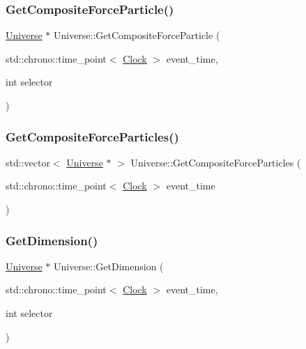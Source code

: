 \mbox{\label{classUniverse_a3e2acc1d75765a6e8e852fca919c5b96}} 
\subsubsection{\texorpdfstring{Get\+Composite\+Force\+Particle()}{GetCompositeForceParticle()}}
{\footnotesize\ttfamily \mbox{\hyperlink{classUniverse}{Universe}} $\ast$ Universe\+::\+Get\+Composite\+Force\+Particle (\begin{DoxyParamCaption}\item[{std\+::chrono\+::time\+\_\+point$<$ \mbox{\hyperlink{universe_8h_a0ef8d951d1ca5ab3cfaf7ab4c7a6fd80}{Clock}} $>$}]{event\+\_\+time,  }\item[{int}]{selector }\end{DoxyParamCaption})}

\mbox{\label{classUniverse_aed37d7224b4e31bdfb0632e39bf19694}} 
\subsubsection{\texorpdfstring{Get\+Composite\+Force\+Particles()}{GetCompositeForceParticles()}}
{\footnotesize\ttfamily std\+::vector$<$ \mbox{\hyperlink{classUniverse}{Universe}} $\ast$ $>$ Universe\+::\+Get\+Composite\+Force\+Particles (\begin{DoxyParamCaption}\item[{std\+::chrono\+::time\+\_\+point$<$ \mbox{\hyperlink{universe_8h_a0ef8d951d1ca5ab3cfaf7ab4c7a6fd80}{Clock}} $>$}]{event\+\_\+time }\end{DoxyParamCaption})}

\mbox{\label{classUniverse_ab79a380dee684c6dc304b571f4d28645}} 
\subsubsection{\texorpdfstring{Get\+Dimension()}{GetDimension()}}
{\footnotesize\ttfamily \mbox{\hyperlink{classUniverse}{Universe}} $\ast$ Universe\+::\+Get\+Dimension (\begin{DoxyParamCaption}\item[{std\+::chrono\+::time\+\_\+point$<$ \mbox{\hyperlink{universe_8h_a0ef8d951d1ca5ab3cfaf7ab4c7a6fd80}{Clock}} $>$}]{event\+\_\+time,  }\item[{int}]{selector }\end{DoxyParamCaption})}

